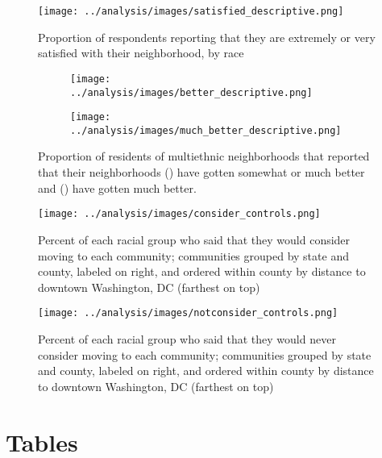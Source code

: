 \documentclass[11pt]{baderart}
\begin{document}
\begin{figure}[ht!]
\centering
\texttt{[image: ../analysis/images/satisfied\_descriptive.png]}
\caption{Proportion of respondents reporting that they are extremely or very satisfied with their neighborhood, by race}
\label{fig:satisfaction}
\end{figure}

\begin{sidewaysfigure}
\begin{subfigure}{.49\textwidth}
\texttt{[image: ../analysis/images/better\_descriptive.png]}
\caption{}
\label{subfig:better}
\end{subfigure}\quad\begin{subfigure}{.49\textwidth}
\texttt{[image: ../analysis/images/much\_better\_descriptive.png]}
\caption{}
\label{subfig:muchbetter}
\end{subfigure}
\caption{Proportion of residents of multiethnic neighborhoods that reported that their neighborhoods () have gotten somewhat or much better and () have gotten much better.}
\label{fig:improvement}
\end{sidewaysfigure}

\begin{sidewaysfigure}
\texttt{[image: ../analysis/images/consider\_controls.png]}
\caption{Percent of each racial group who said that they would consider moving to each community; communities grouped by state and county, labeled on right, and ordered within county by distance to downtown Washington, DC (farthest on top)}
\label{fig:consider}
\end{sidewaysfigure}

\begin{sidewaysfigure}
\texttt{[image: ../analysis/images/notconsider\_controls.png]}
\caption{Percent of each racial group who said that they would never consider moving to each community; communities grouped by state and county, labeled on right, and ordered within county by distance to downtown Washington, DC (farthest on top)}
\label{fig:notconsider}
\end{sidewaysfigure}


\clearpage
\section{Tables}







\end{document}
